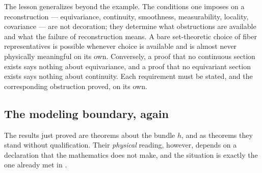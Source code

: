 \documentclass[11pt,reqno]{amsart}
\theoremstyle{plain}
\theoremstyle{definition}
\theoremstyle{remark}
\begin{document}
The lesson generalizes beyond the example. The conditions one imposes on a reconstruction --- equivariance, continuity, smoothness, measurability, locality, covariance --- are not decoration; they determine what obstructions are available and what the failure of reconstruction means. A bare set-theoretic choice of fiber representatives is possible whenever choice is available and is almost never physically meaningful on its own. Conversely, a proof that no continuous section exists says nothing about equivariance, and a proof that no equivariant section exists says nothing about continuity. Each requirement must be stated, and the corresponding obstruction proved, on its own.

\subsection{The modeling boundary, again}

The results just proved are theorems about the bundle $h$, and as theorems they stand without qualification. Their \emph{physical} reading, however, depends on a declaration that the mathematics does not make, and the situation is exactly the one already met in .
\end{document}
